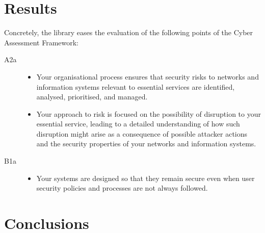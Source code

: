 \documentclass{scrreprt}
\begin{document}
\chapter{Results}
\label{results}

Concretely, the library eases the evaluation of the following points of the
Cyber Assessment Framework:

\begin{description}
    \item [A2a]
        \begin{itemize}
            \item Your organisational process ensures that security risks to
                networks and information systems relevant to essential services
                are identified, analysed, prioritised, and managed.
            \item Your approach to risk is focused on the possibility of
                disruption to your essential service, leading to a detailed
                understanding of how such disruption might arise as a
                consequence of possible attacker actions and the security
                properties of your networks and information systems.
        \end{itemize}

    \item [B1a]
        \begin{itemize}
            \item Your systems are designed so that they remain secure even when
                user security policies and processes are not always followed.
        \end{itemize}
\end{description}


\chapter{Conclusions}
\label{conclusions}



\end{document}

